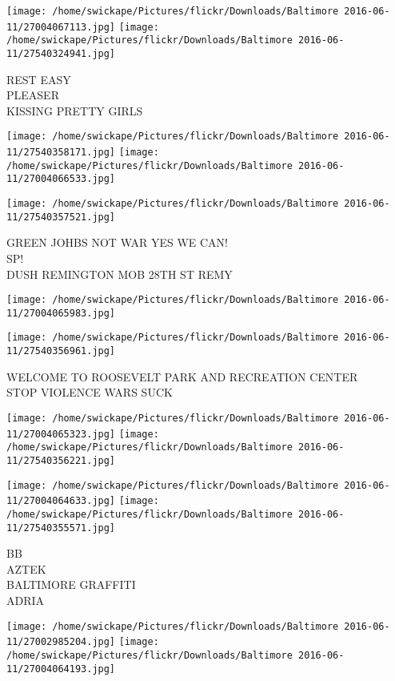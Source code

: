 \documentclass[10pt,letterpaper]{article}
\begin{document}
\vspace{0.25in}
\texttt{[image: /home/swickape/Pictures/flickr/Downloads/Baltimore 2016-06-11/27004067113.jpg]}
\texttt{[image: /home/swickape/Pictures/flickr/Downloads/Baltimore 2016-06-11/27540324941.jpg]}

REST EASY\\
PLEASER\\
KISSING PRETTY GIRLS\\
\pagebreak

\texttt{[image: /home/swickape/Pictures/flickr/Downloads/Baltimore 2016-06-11/27540358171.jpg]}
\texttt{[image: /home/swickape/Pictures/flickr/Downloads/Baltimore 2016-06-11/27004066533.jpg]}

\texttt{[image: /home/swickape/Pictures/flickr/Downloads/Baltimore 2016-06-11/27540357521.jpg]}

GREEN JOHBS NOT WAR YES WE CAN!\\
SP!\\
DUSH REMINGTON MOB 28TH ST REMY\\
\pagebreak

\texttt{[image: /home/swickape/Pictures/flickr/Downloads/Baltimore 2016-06-11/27004065983.jpg]}

\vspace{0.25in}
\texttt{[image: /home/swickape/Pictures/flickr/Downloads/Baltimore 2016-06-11/27540356961.jpg]}

WELCOME TO ROOSEVELT PARK AND RECREATION CENTER\\
STOP VIOLENCE WARS SUCK\\
\pagebreak

\texttt{[image: /home/swickape/Pictures/flickr/Downloads/Baltimore 2016-06-11/27004065323.jpg]}
\texttt{[image: /home/swickape/Pictures/flickr/Downloads/Baltimore 2016-06-11/27540356221.jpg]}

\texttt{[image: /home/swickape/Pictures/flickr/Downloads/Baltimore 2016-06-11/27004064633.jpg]}
\texttt{[image: /home/swickape/Pictures/flickr/Downloads/Baltimore 2016-06-11/27540355571.jpg]}

BB\\
AZTEK\\
BALTIMORE GRAFFITI\\
ADRIA\\
\pagebreak

\texttt{[image: /home/swickape/Pictures/flickr/Downloads/Baltimore 2016-06-11/27002985204.jpg]}
\texttt{[image: /home/swickape/Pictures/flickr/Downloads/Baltimore 2016-06-11/27004064193.jpg]}
\end{document}
